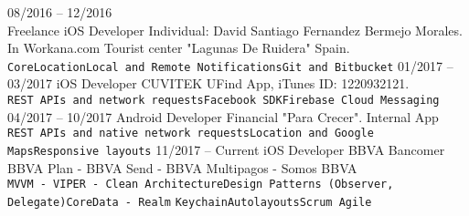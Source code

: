\documentclass[8pt]{developercv} %
\begin{document}
\begin{entrylist}
	\entry
		{08/2016 -- 12/2016\\\footnotesize{Freelance}}
		{iOS Developer}
		{Individual: David Santiago Fernandez Bermejo Morales. In Workana.com}
		{Tourist center "Lagunas De Ruidera" Spain.
		\\ \texttt{CoreLocation}\slashsep\texttt{Local and Remote Notifications}\slashsep\texttt{Git and Bitbucket}		
		}
	\entry
		{01/2017 -- 03/2017}
		{iOS Developer}
		{CUVITEK}
		{UFind App, iTunes ID: 1220932121.
		\\ \texttt{REST APIs and network requests}\slashsep\texttt{Facebook SDK}\slashsep\texttt{Firebase Cloud Messaging}		
		}
		\entry
		{04/2017 -- 10/2017}
		{Android Developer}
		{Financial "Para Crecer".}
		{Internal App
		\\ \texttt{REST APIs and native network requests}\slashsep\texttt{Location and Google Maps}\slashsep\texttt{Responsive layouts}		
		}
		\entry
		{11/2017 -- Current}
		{iOS Developer}
		{BBVA Bancomer}
		{BBVA Plan - BBVA Send - BBVA Multipagos - Somos BBVA
		\\ \texttt{MVVM - VIPER - Clean Architecture}\slashsep\texttt{Design Patterns (Observer, Delegate)}\slashsep\texttt{CoreData - Realm}\slashsep		
		 \texttt{Keychain}\slashsep\texttt{Autolayouts}\slashsep\texttt{Scrum Agile}		
		}
\end{entrylist}


\end{document}
